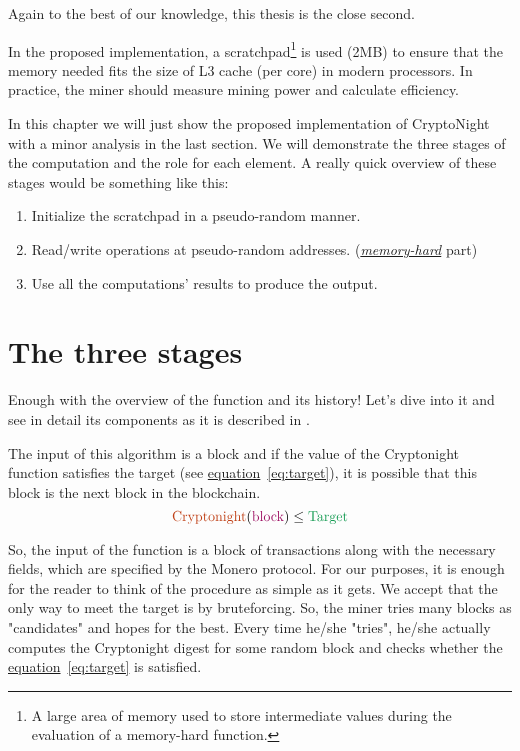 Again to the best of our knowledge, this thesis is the close second.

In the proposed implementation, a scratchpad\footnote{A large area of memory used to store intermediate values during the evaluation of a memory-hard function.} is used (2MB) to ensure that the memory needed fits the size of L3 cache (per core) in modern processors. In practice, the miner should measure mining power and calculate efficiency.

In this chapter we will just show the proposed implementation of CryptoNight with a minor analysis in the last section. We will demonstrate the three stages of the computation and the role for each element. A really quick overview of these stages would be something like this:

\begin{enumerate}
  \item Initialize the scratchpad in a pseudo-random manner.
  \item Read/write operations at pseudo-random addresses. (\hyperref[sec:memory-hard]{\emph{memory-hard}} part)
  \item Use all the computations' results to produce the output.
\end{enumerate}

\section{The three stages}
Enough with the overview of the function and its history! Let's dive into it and see in detail its components as it is described in \cite{cryptonight}.

The input of this algorithm is a block and if the value of the Cryptonight function satisfies the target (see \hyperref[eq:target]{equation}~\ref{eq:target}), it is possible that this block is the next block in the blockchain.
\begin{equation}
  \label{eq:target}
  \color{Bittersweet} \mbox{Cryptonight}
  \color{black} (
  \color{RedViolet} \mbox{block}
  \color{black} )\leq
  \color{ForestGreen} \mbox{Target}
  \color{black}
\end{equation}

So, the input of the function is a block of transactions along with the necessary fields, which are specified by the Monero protocol. For our purposes, it is enough for the reader to think of the procedure as simple as it gets. We accept that the only way to meet the target is by bruteforcing. So, the miner tries many blocks as "candidates" and hopes for the best. Every time he/she "tries", he/she actually computes the Cryptonight digest for some random block and checks whether the \hyperref[eq:target]{equation}~\ref{eq:target} is satisfied.

